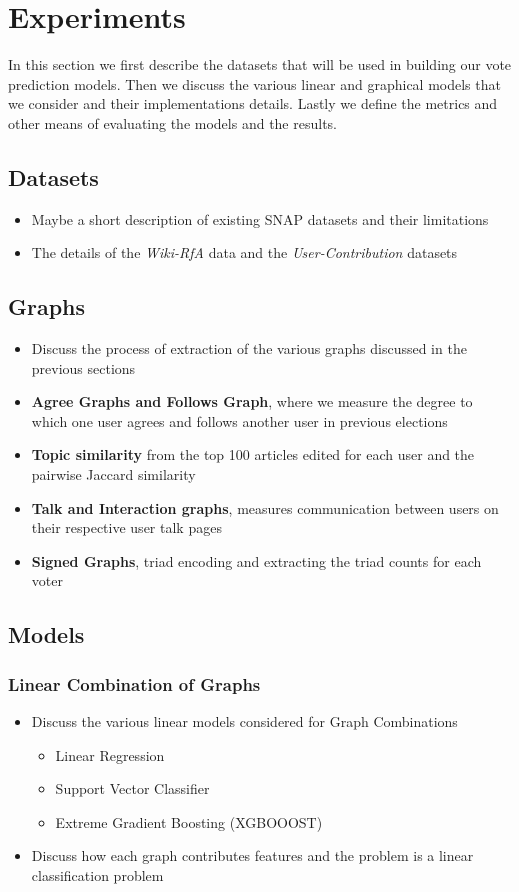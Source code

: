\chapter{Experiments}
\label{chp:experiments}
In this section we first describe the datasets that will be used in building our vote prediction models. Then we discuss the various linear and graphical models that we consider and their implementations details. Lastly we define the metrics and other means of evaluating the models and the results.

\section{Datasets}
\begin{itemize}
    \item Maybe a short description of existing SNAP datasets and their limitations
    \item The details of the \textit{Wiki-RfA} data and the \textit{User-Contribution} datasets
\end{itemize}
\section{Graphs}
\begin{itemize}
    \item Discuss the process of extraction of the various graphs discussed in the previous sections
    \item \textbf{Agree Graphs and Follows Graph}, where we measure the degree to which one user agrees and follows another user in previous elections
    \item \textbf{Topic similarity} from the top 100 articles edited for each user and the pairwise Jaccard similarity 
    \item \textbf{Talk and Interaction graphs}, measures communication between users on their respective user talk pages
    \item \textbf{Signed Graphs}, triad encoding and extracting the triad counts for each voter
\end{itemize}
\section{Models}
\subsection{Linear Combination of Graphs}
\begin{itemize}
    \item Discuss the various linear models considered for Graph Combinations
    \begin{itemize}
        \item Linear Regression
        \item Support Vector Classifier
        \item Extreme Gradient Boosting (XGBOOOST) 
    \end{itemize}
    \item Discuss how each graph contributes features and the problem is a linear classification problem
\end{itemize}
